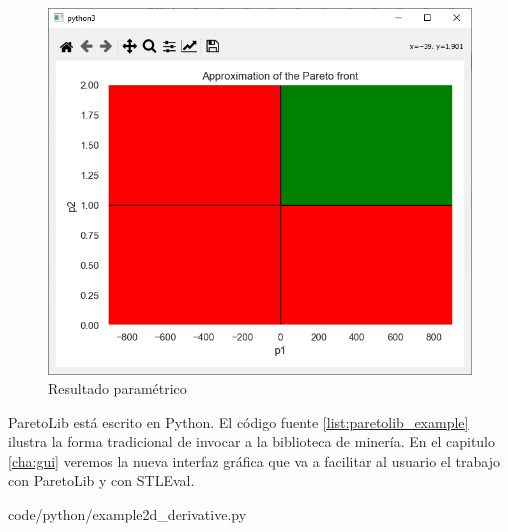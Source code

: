 \begin{figure}[htb]
\centering
  \includegraphics[width=0.7\linewidth]{images/stl_parametrico} 
\caption{Resultado paramétrico}
\label{fig:param}
\end{figure}


ParetoLib está escrito en Python. El código fuente \ref{list:paretolib_example} ilustra la forma tradicional de invocar a la biblioteca de minería. En el capitulo \ref{cha:gui} veremos la nueva interfaz gráfica que va a facilitar al usuario el trabajo con ParetoLib y con STLEval.



		{code/python/example2d_derivative.py}
